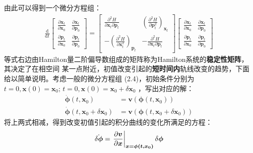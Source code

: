     由此可以得到一个微分方程组：
    \begin{equation}
        \displaystyle
        \begin{split}
            \frac {\mathrm{d}}{\mathrm{d}t}
            \begin{bmatrix}
                \frac {\partial \bm{x}_t}{\partial \bm{x}_0} & \frac {\partial \bm{x}_t}{\partial \bm{p}_0}\\
                \frac {\partial \bm{p}_t}{\partial \bm{x}_0} & \frac {\partial \bm{p}_t}{\partial \bm{p}_0}
            \end{bmatrix}
            =
            \begin{bmatrix}
                \frac {\partial^2 H}{\partial \bm{x}_t \partial \bm{p}_t} & (\frac {\partial^2 H}{\partial \bm{p}_t^2})_{\bm{x}_t}\\
                -(\frac {\partial^2 H}{\partial \bm{x}_t^2})_{\bm{p}_t} & - \frac {\partial^2 H}{\partial \bm{x}_t \partial \bm{p}_t}
            \end{bmatrix}
            \begin{bmatrix}
                \frac {\partial \bm{x}_t}{\partial \bm{x}_0} & \frac {\partial \bm{x}_t}{\partial \bm{p}_0}\\
                \frac {\partial \bm{p}_t}{\partial \bm{x}_0} & \frac {\partial \bm{p}_t}{\partial \bm{p}_0}
            \end{bmatrix}
        \end{split}
    \end{equation}
    等式右边由Hamilton量二阶偏导数组成的矩阵称为Hamilton系统的\textbf{稳定性矩阵}，其决定了在相空间
    某一点附近，初值改变引起的\textbf{短时间内}轨线改变的趋势，下面给以简单说明。考虑一般的微分方程组
    (2.4)，初始条件分别为$t=0, \bm{x}(0) = \bm{x}_0;\, t=0, \bm{x}(0) = \bm{x}_0 + \delta\bm{x}_0$
    ，写出对应的解：
    \begin{equation}
        \begin{split}
            \dot{\bm{\phi}}(t, \bm{x}_0) &= \bm{v}(\bm{\phi}(t, \bm{x}_0))\\
            \dot{\bm{\phi}}(t, \bm{x}_0 + \delta\bm{x}_0) &= \bm{v}(\bm{\phi}(t, \bm{x}_0 + \delta\bm{x}_0))
        \end{split}
    \end{equation}
    将上两式相减，得到改变初值引起的积分曲线的变化所满足的方程：
    \begin{equation}
        \dot{\delta\bm{\phi}} = \left.\frac{\partial{\bm{v}}}{\partial{\bm{x}}}\right|_{\bm{x = \bm{\phi(t, \bm{x}_0)}}} \delta\bm{\phi}
    \end{equation}
